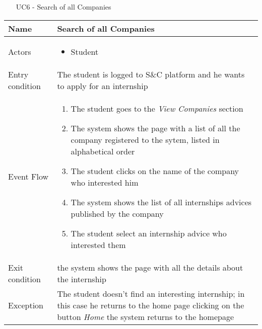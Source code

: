 				
				\begin{table} [H]
					\centering
					\begin{itemize}
						\item [UC6] - Search of all Companies
					\end{itemize}
					\begin{tabular}{|| P{7.5cm} | P{7.5cm} ||}
						\hline
						Name & Search of all Companies \\
						\hline
						Actors & \parbox{5cm}{\begin{itemize}
								\item Student
							\end{itemize}
						} \\
						\hline
						Entry condition & The student is logged to S\&C platform and he wants to apply for an internship \\
						\hline
						Event Flow & \parbox{5cm}{\begin{enumerate}[label=\alpha]
								\item The student goes to the \textit{View 
									Companies} section
								\item The system shows the page with a 
								list of all the company registered to 
								the sytem, listed in alphabetical 
								order   
								\item The student clicks on the name of 
								the company who interested him
								\item The system shows the list of all 
								internships advices published by 
								the company 
								\item The student select an internship advice who 
								interested them
						\end{enumerate}} \\
						\hline 
						Exit condition &  the system shows the 
						page with all the details about the 
						internship \\
						\hline
						Exception & The student doesn’t find an interesting 
						internship; in this case he returns to the 
						home page clicking on the button \textit{Home}
						the system returns to the homepage 
						\\
						\hline
					\end{tabular}
				\end{table}
				
				
				
